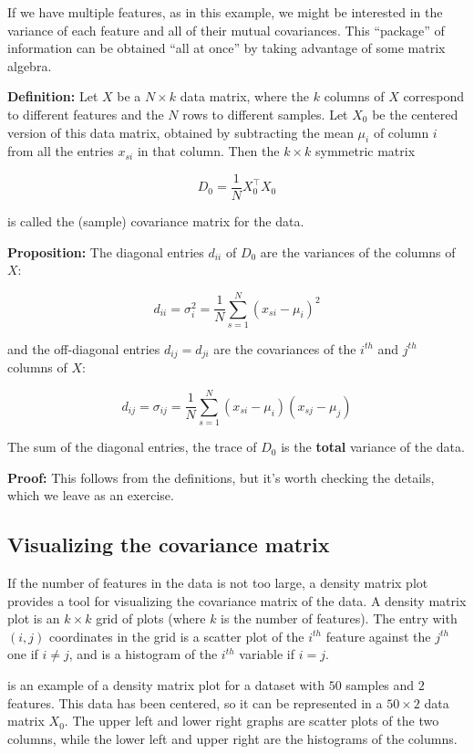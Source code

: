 \documentclass[
  oneside]{scrbook}
\begin{document}
If we have multiple features, as in this example, we might be interested
in the variance of each feature and all of their mutual covariances.
This ``package'' of information can be obtained ``all at once'' by
taking advantage of some matrix algebra.

\textbf{Definition:} Let \(X\) be a \(N\times k\) data matrix, where the
\(k\) columns of \(X\) correspond to different features and the \(N\)
rows to different samples. Let \(X_{0}\) be the centered version of this
data matrix, obtained by subtracting the mean \(\mu_{i}\) of column
\(i\) from all the entries \(x_{si}\) in that column. Then the
\(k\times k\) symmetric matrix

\[
D_{0} = \frac{1}{N}X_{0}^{\intercal}X_{0}
\]

is called the (sample) covariance matrix for the data.

\textbf{Proposition:} The diagonal entries \(d_{ii}\) of \(D_{0}\) are
the variances of the columns of \(X\):

\[
d_{ii} = \sigma_{i}^2 = \frac{1}{N}\sum_{s=1}^{N}(x_{si}-\mu_i)^2
\]

and the off-diagonal entries \(d_{ij} = d_{ji}\) are the covariances of
the \(i^{th}\) and \(j^{th}\) columns of \(X\):

\[
d_{ij} = \sigma_{ij} = \frac{1}{N}\sum_{s=1}^{N}(x_{si}-\mu_{i})(x_{sj}-\mu_{j})
\]

The sum of the diagonal entries, the trace of \(D_{0}\) is the
\textbf{total} variance of the data.

\textbf{Proof:} This follows from the definitions, but it's worth
checking the details, which we leave as an exercise.

\hypertarget{sec:visualizecovar}{%
\subsection{Visualizing the covariance
matrix}\label{sec:visualizecovar}}

If the number of features in the data is not too large, a density matrix
plot provides a tool for visualizing the covariance matrix of the data.
A density matrix plot is an \(k\times k\) grid of plots (where \(k\) is
the number of features). The entry with \((i,j)\) coordinates in the
grid is a scatter plot of the \(i^{th}\) feature against the \(j^{th}\)
one if \(i\not=j\), and is a histogram of the \(i^{th}\) variable if
\(i=j\).

 is an example of a density matrix plot for a dataset
with \(50\) samples and \(2\) features. This data has been centered, so
it can be represented in a \(50\times 2\) data matrix \(X_{0}\). The
upper left and lower right graphs are scatter plots of the two columns,
while the lower left and upper right are the histograms of the columns.
\end{document}
